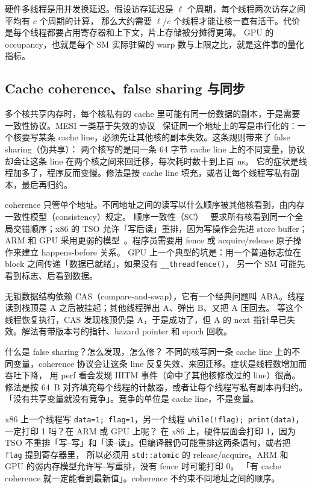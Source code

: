 硬件多线程是用并发换延迟。假设访存延迟是 $\ell$ 个周期，每个线程两次访存之间平均有 $c$ 个周期的计算，
那么大约需要 $\ell/c$ 个线程才能让核一直有活干。代价是每个线程都要占用寄存器和上下文，片上存储被分摊得更薄。
GPU 的 occupancy，也就是每个 SM 实际驻留的 warp 数与上限之比，就是这件事的量化指标。

\subsection{Cache coherence、false sharing 与同步}

多个核共享内存时，每个核私有的 cache 里可能有同一份数据的副本，于是需要一致性协议。MESI 一类基于失效的协议~\cite{papamarcos1984low}
保证同一个地址上的写是串行化的：一个核要写某条 cache line，必须先让其他核的副本失效。这条规则带来了 false sharing（伪共享）：
两个核写的是同一条 64 字节 cache line 上的不同变量，协议却会让这条 line 在两个核之间来回迁移，每次耗时数十到上百 ns。
它的症状是线程加多了，程序反而变慢。修法是按 cache line 填充，或者让每个线程写私有副本，最后再归约。

coherence 只管单个地址。不同地址之间的读写以什么顺序被其他核看到，由内存一致性模型（consistency）规定。
顺序一致性（SC）~\cite{lamport1979make} 要求所有核看到同一个全局交错顺序；x86 的 TSO 允许「写后读」重排，因为写操作会先进 store buffer；
ARM 和 GPU 采用更弱的模型~\cite{adve1996shared}。程序员需要用 fence 或 acquire/release 原子操作来建立 happens-before 关系。
GPU 上一个典型的坑是：用一个普通标志位在 block 之间传递「数据已就绪」，如果没有 \texttt{\_\_threadfence()}，
另一个 SM 可能先看到标志、后看到数据。

无锁数据结构依赖 CAS（compare-and-swap），它有一个经典问题叫 ABA。线程读到栈顶是 A 之后被挂起；其他线程弹出 A、弹出 B、又把 A 压回去。
等这个线程恢复执行，CAS 发现栈顶仍是 A，于是成功了，但 A 的 next 指针早已失效。解法有带版本号的指针、hazard pointer 和 epoch 回收。

\begin{qa}{什么是 false sharing？怎么发现，怎么修？}
\ans 不同的核写同一条 cache line 上的不同变量，coherence 协议会让这条 line 反复失效、来回迁移。症状是线程数增加而吞吐下降，
用 perf 看会发现 HITM 事件（命中了其他核修改过的 line）很高。修法是按 64~B 对齐填充每个线程的计数器，或者让每个线程写私有副本再归约。
\wrong 「没有共享变量就没有竞争」。竞争的单位是 cache line，不是变量。
\end{qa}

\begin{qa}{x86 上一个线程写 \texttt{data=1; flag=1}，另一个线程 \texttt{while(!flag); print(data)}，一定打印 1 吗？在 ARM 或 GPU 上呢？}
\ans 在 x86 上，硬件层面会打印 1，因为 TSO 不重排「写--写」和「读--读」。但编译器仍可能重排这两条语句，或者把 \texttt{flag} 提到寄存器里，
所以必须用 \texttt{std::atomic} 的 release/acquire。ARM 和 GPU 的弱内存模型允许写--写重排，没有 fence 时可能打印 0。
\wrong 「有 cache coherence 就一定能看到最新值」。coherence 不约束不同地址之间的顺序。
\end{qa}

